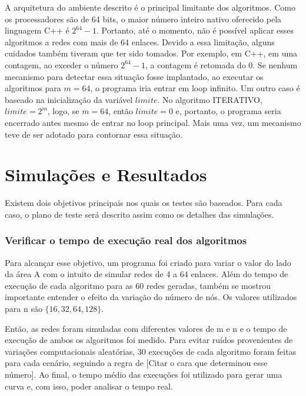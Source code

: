 A arquitetura do ambiente descrito é o principal limitante dos algoritmos. Como os processadores são de 64 bits, o maior número inteiro nativo oferecido pela linguagem C++ é $2^{64}-1$. Portanto, até o momento, não é possível aplicar esses algoritmos a redes com mais de 64 enlaces. Devido a essa limitação, alguns cuidados também tiveram que ter sido tomados. Por exemplo, em C++, em uma contagem, ao exceder o número $2^{64}-1$, a contagem é retomada do 0. Se nenhum mecanismo para detectar essa situação fosse implantado, ao executar os algoritmos para $m=64$, o programa iria entrar em loop infinito. Um outro caso é baseado na inicialização da variável $limite$. No algoritmo ITERATIVO, $limite = 2^m$, logo, se $m=64$, então $limite=0$ e, portanto, o programa seria encerrado antes mesmo de entrar no loop principal. Mais uma vez, um mecanismo teve de ser adotado para contornar essa situação.

\section{Simulações e Resultados}

Existem dois objetivos principais nos quais os testes são baseados. Para cada caso, o plano de teste será descrito assim como os detalhes das simulações.

\subsubsection{Verificar o tempo de execução real dos algoritmos}

Para alcançar esse objetivo, um programa foi criado para variar o valor do lado da área A com o intuito de simular redes de 4 a 64 enlaces. Além do tempo de execução de cada algoritmo para as 60 redes geradas, também se mostrou importante entender o efeito da variação do número de nós. Os valores utilizados para n são $\{16, 32, 64, 128\}$. 

Então, as redes foram simuladas com diferentes valores de m e n e o tempo de execução de ambos os algoritmos foi medido. Para evitar ruídos provenientes de variações computacionais aleatórias, 30 execuções de cada algoritmo foram feitas para cada cenário, seguindo a regra de [Citar o cara que determinou esse número]. Ao final, o tempo médio das execuções foi utilizado para gerar uma curva e, com isso, poder analisar o tempo real.



